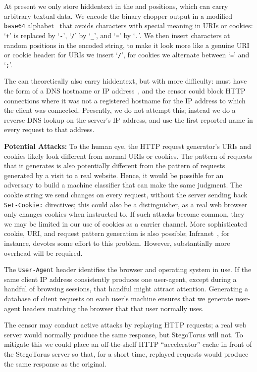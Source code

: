 At present we only store hiddentext in the  and
 positions, which can carry arbitrary textual data.
We encode the binary chopper output in a modified \texttt{base64}
alphabet~\cite{s-base64} that avoids characters with special meaning
in URIs or cookies: `\texttt{+}' is replaced by `\texttt{-}',
`\texttt{/}' by `\texttt{\_}', and `\texttt{=}' by `\texttt{.}'.  We
then insert characters at random positions in the encoded string, to
make it look more like a genuine URI or cookie header: for URIs we
insert `\texttt{/}', for cookies we alternate between `\texttt{=}' and
`\texttt{;}'.

The  can theoretically also carry hiddentext, but with
more difficulty:  must have the form of a DNS hostname
or IP address~\cite{s-http}, and the censor could block HTTP
connections where it was not a registered hostname for the IP address
to which the client was connected.  Presently, we do not attempt this;
instead we do a reverse DNS lookup on the server's IP address, and use
the first reported name in every request to that address.

\smallskip\noindent\textbf{Potential Attacks:}
To the human eye, the HTTP request generator's URIs and cookies likely
look different from normal URIs or cookies.  The pattern of requests
that it generates is also potentially different from the pattern of
requests generated by a visit to a real website.  Hence, it would be
possible for an adversary to build a machine classifier that can make
the same judgment.  The cookie string we send changes on every
request, without the server sending back \texttt{Set-Cookie:}
directives; this could also be a distinguisher, as a real web browser
only changes cookies when instructed to.  If such attacks become
common, they we may be limited in our use of cookies as a carrier
channel.  More sophisticated cookie, URI, and request pattern
generation is also possible; Infranet~\cite{c-infranet}, for instance,
devotes some effort to this problem.  However, substantially more
overhead will be required.

The \texttt{User-Agent} header identifies the browser and operating
system in use.  If the same client IP address consistently produces
one user-agent, except during a handful of browsing sessions, that
handful might attract attention.  Generating a database of client
requests on each user's machine ensures that we generate user-agent
headers matching the browser that that user normally uses.

The censor may conduct active attacks by replaying HTTP requests; a
real web server would normally produce the same response, but
StegoTorus will not.  To mitigate this we could place an off-the-shelf
HTTP “accelerator” cache in front of the StegoTorus server so that,
for a short time, replayed requests would produce the same response as
the original.


